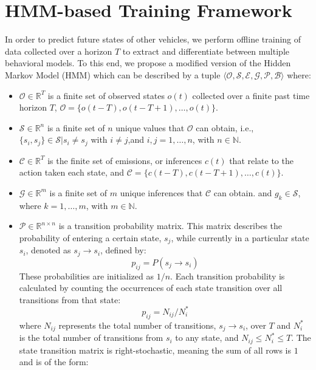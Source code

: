 \documentclass[letterpaper, 10 pt, conference]{ieeeconf}  %
\begin{document}
\section{HMM-based Training Framework} \label{sec:fmwk}
 In order to predict future states of other vehicles, we perform offline training of data collected over a horizon $T$ to extract and differentiate between multiple behavioral models. To this end, we propose a modified version of the Hidden Markov Model (HMM) \cite{woohmm} which can be described by a tuple $\langle \mathcal{O},\mathcal{S},\mathcal{E},\mathcal{G},\mathcal{P},\mathcal{B} \rangle$  where:
\begin{itemize}
    \item $\mathcal{O}\in\mathbb{R}^T$ is a finite set of observed states $o(t)$ collected over a finite past time horizon $T$, $\mathcal{O} = \{ o(t-T), o(t-T+1), \ldots, o(t)\}$. 
    \item  $\mathcal{S}\in\mathbb{R}^n$ is a finite set of $n$ unique values that $\mathcal{O}$ can obtain, i.e., $\{s_i,s_j\} \in \mathcal{S} \vert s_i \neq s_j$ with $i\neq j$,and $i,j = 1,\ldots,n$, with $n \in \mathbb{N}$.
    \item $\mathcal{C}\in\mathbb{R}^T$
    is the finite set of emissions, or inferences $c(t)$ that relate to the action taken each state, and $\mathcal{C} = \{ c(t-T), c(t-T+1), \ldots, c(t)\}$.
    \item $\mathcal{G}\in\mathbb{R}^m$ is a finite set of $m$ unique inferences that $\mathcal{C}$ can obtain. and $g_k \in \mathcal{S}$, where $k = 1,\ldots,m$, with $m \in \mathbb{N}$. 
    \item $\mathcal{P}\in\mathbb{R}^{n\times n}$ is a transition probability matrix. This matrix describes the probability of entering a certain state, $s_{j}$, while currently in a particular state $s_{i}$, denoted as $s_j \to s_i$, defined by:
        \begin{equation}
            p_{ij} = P(s_j\to s_i)
        \end{equation}
        These probabilities are initialized as $1/n$. Each transition probability is calculated by counting the occurrences of each state transition over all transitions from that state:
        \begin{equation} \label{eq:transbuild}
            p_{ij} = N_{ij}/N^*_{i}
        \end{equation}
        where $N_{ij}$ represents the total number of transitions, $s_j \to s_i$, over $T$ and $N^*_{i}$ is the total number of transitions from $s_i$ to any state, and $N_{ij} \leq N^*_{i} \leq T$. The state transition matrix is right-stochastic, meaning the sum of all rows is $1$ and is of the form:

\end{itemize}
\end{document}
